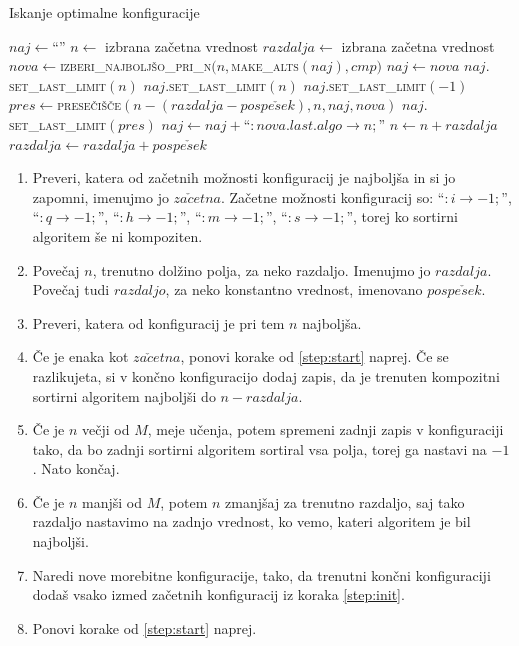 \documentclass[a4paper,oneside,12pt]{article}
\newcommand{\lra}{\ensuremath{\longrightarrow}}
\begin{document}
\begin{algorithm}
  \caption{Iskanje optimalne konfiguracije}\label{algo:conf}
  \begin{algorithmic}[1]
    \State $naj \gets $``''
    \State $n \gets $ izbrana začetna vrednost
    \State $razdalja \gets $ izbrana začetna vrednost
      \State $nova \gets $\textsc{izberi\_najboljšo\_pri\_n}$(n, $\textsc{make\_alts}$(naj), cmp)$
        \State $naj \gets nova$
        \State $naj.$\textsc{set\_last\_limit}$(n)$
        \State $naj.$\textsc{set\_last\_limit}$(n)$
      \Else
        \State $naj.$\textsc{set\_last\_limit}$(-1)$
        \State $pres \gets $\textsc{presečišče}$(n-(razdalja-pospe\check{s}ek), n, naj, nova)$
        \State $naj.$\textsc{set\_last\_limit}$(pres)$
        \State $naj \gets naj + $``$:nova.last.algo \lra n;$''
      \EndIf
      \State $n \gets n + razdalja$
      \State $razdalja \gets razdalja + pospe\check{s}ek$
    \EndWhile
  \end{algorithmic}
\end{algorithm}

\begin{enumerate}
  \item \label{step:init}Preveri, katera od začetnih možnosti konfiguracij je najboljša in
    si jo zapomni, imenujmo jo $za\check{c}etna$. Začetne možnosti konfiguracij so:
    ``$:i \lra -1;$'', ``$:q \lra -1;$'', ``$:h \lra -1;$'',
    ``$:m \lra -1;$'', ``$:s \lra -1;$'', torej ko sortirni algoritem še ni kompoziten.
  \item \label{step:start}Povečaj $n$, trenutno dolžino polja, za neko razdaljo. Imenujmo
    jo $razdalja$. Povečaj tudi $razdaljo$, za neko konstantno vrednost, imenovano
    $pospe\check{s}ek$.
  \item Preveri, katera od konfiguracij je pri tem $n$ najboljša.
  \item \label{step:check}Če je enaka kot $za\check{c}etna$, ponovi korake od \ref{step:start} 
    naprej. Če se razlikujeta, si v končno konfiguracijo dodaj zapis, da je
    trenuten kompozitni sortirni algoritem najboljši do $n - razdalja$.
  \item Če je $n$ večji od $M$, meje učenja, potem spremeni zadnji zapis v konfiguraciji
    tako, da bo zadnji sortirni algoritem sortiral vsa polja, torej ga nastavi na $-1$.
    Nato končaj.
  \item Če je $n$ manjši od $M$, potem $n$ zmanjšaj za trenutno razdaljo, saj
    tako razdaljo nastavimo na zadnjo vrednost, ko vemo, kateri algoritem je bil
    najboljši.
  \item Naredi nove morebitne konfiguracije, tako, da trenutni končni konfiguraciji dodaš
    vsako izmed začetnih konfiguracij iz koraka \ref{step:init}.
  \item Ponovi korake od \ref{step:start} naprej.
\end{enumerate}
\end{document}
